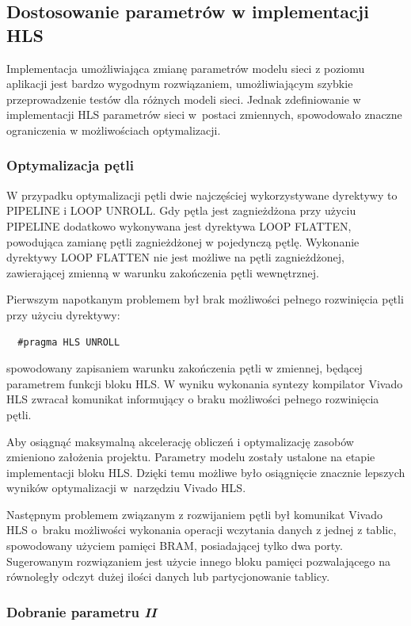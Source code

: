 \subsection{Dostosowanie parametrów w implementacji HLS}

Implementacja umożliwiająca zmianę parametrów modelu sieci z poziomu aplikacji jest bardzo wygodnym 
rozwiązaniem, umożliwiającym szybkie przeprowadzenie testów dla różnych modeli sieci. Jednak 
zdefiniowanie w implementacji HLS parametrów sieci w~postaci zmiennych, spowodowało znaczne 
ograniczenia w możliwościach optymalizacji. 

\subsubsection{Optymalizacja pętli}

W przypadku optymalizacji pętli dwie najczęściej wykorzystywane dyrektywy to PIPELINE i LOOP UNROLL. Gdy pętla jest zagnieżdżona przy użyciu PIPELINE dodatkowo wykonywana jest dyrektywa LOOP FLATTEN, powodująca zamianę pętli zagnieżdżonej w pojedynczą pętlę. Wykonanie dyrektywy LOOP FLATTEN nie jest możliwe na pętli zagnieżdżonej, zawierającej zmienną w warunku zakończenia pętli wewnętrznej.

Pierwszym napotkanym problemem był brak możliwości pełnego rozwinięcia pętli przy użyciu dyrektywy:
\begin{verbatim}
  #pragma HLS UNROLL
\end{verbatim}
spowodowany zapisaniem warunku zakończenia pętli w zmiennej, będącej parametrem funkcji bloku HLS. 
W wyniku wykonania syntezy kompilator Vivado HLS zwracał komunikat informujący o braku możliwości pełnego rozwinięcia pętli.

Aby osiągnąć maksymalną akcelerację obliczeń i optymalizację zasobów zmieniono założenia projektu. Parametry modelu zostały ustalone na etapie implementacji bloku HLS. Dzięki temu możliwe było osiągnięcie znacznie lepszych wyników optymalizacji w~narzędziu Vivado HLS.

Następnym problemem związanym z rozwijaniem pętli był komunikat Vivado HLS o~braku możliwości wykonania operacji wczytania danych z jednej z tablic, spowodowany użyciem pamięci BRAM, posiadającej tylko dwa porty. Sugerowanym rozwiązaniem jest użycie innego bloku pamięci pozwalającego na równoległy odczyt dużej ilości danych lub partycjonowanie tablicy.

\subsubsection{Dobranie parametru \emph{II}}

